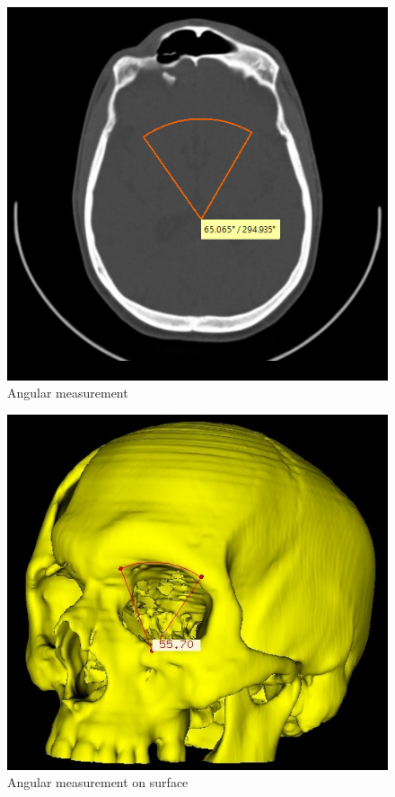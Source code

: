 \begin{figure}[!htb]
\centering
\includegraphics[scale=0.38]{../user_guide_figures/invesalius_screen/axial_angular.png}
\caption{Angular measurement}
\label{fig:axial_angular}
\end{figure}

\begin{figure}[!htb]
\centering
\includegraphics[scale=0.33]{../user_guide_figures/invesalius_screen/angular_superficie.jpg}
\caption{Angular measurement on surface}
\label{fig:axial_superficie}
\end{figure}

